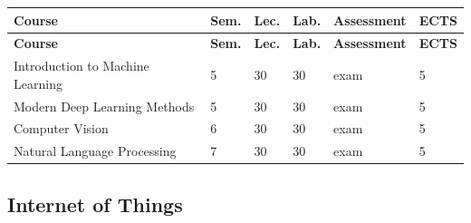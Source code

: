 \documentclass[12pt,a4paper]{article}
\newcommand{\thdrule}{\noalign{\global\setlength{\extrarowheight}{0pt}}}
\newcommand{\thdend}{\noalign{\global\setlength{\extrarowheight}{4pt}}}
\begin{document}
{\scriptsize
\begin{longtable}{m{6.5cm}m{0.7cm}m{1cm}m{1cm}m{1.7cm}m{0.7cm}}
\thdrule\toprule
\rowcolor{pjatkRed}
{\color{white}\footnotesize\textbf{\vphantom{Ag}Course}} & {\color{white}\footnotesize\textbf{\vphantom{Ag}Sem.}} & {\color{white}\footnotesize\textbf{\vphantom{Ag}Lec.}} & {\color{white}\footnotesize\textbf{\vphantom{Ag}Lab.}} & {\color{white}\footnotesize\textbf{\vphantom{Ag}Assessment}} & {\color{white}\footnotesize\textbf{\vphantom{Ag}ECTS}} \\
\midrule\thdend
\endfirsthead
\thdrule\toprule
\rowcolor{pjatkRed}
{\color{white}\footnotesize\textbf{\vphantom{Ag}Course}} & {\color{white}\footnotesize\textbf{\vphantom{Ag}Sem.}} & {\color{white}\footnotesize\textbf{\vphantom{Ag}Lec.}} & {\color{white}\footnotesize\textbf{\vphantom{Ag}Lab.}} & {\color{white}\footnotesize\textbf{\vphantom{Ag}Assessment}} & {\color{white}\footnotesize\textbf{\vphantom{Ag}ECTS}} \\
\midrule\thdend
\endhead
\rowcolor{tableRowLight} Introduction to Machine Learning & 5 & 30 & 30 & {\scriptsize exam} & 5 \\
\rowcolor{tableRowAlt} Modern Deep Learning Methods & 5 & 30 & 30 & {\scriptsize exam} & 5 \\
\rowcolor{tableRowLight} Computer Vision & 6 & 30 & 30 & {\scriptsize exam} & 5 \\
\rowcolor{tableRowAlt} Natural Language Processing & 7 & 30 & 30 & {\scriptsize exam} & 5 \\
\bottomrule
\end{longtable}}

\subsection*{Internet of Things}
\end{document}
